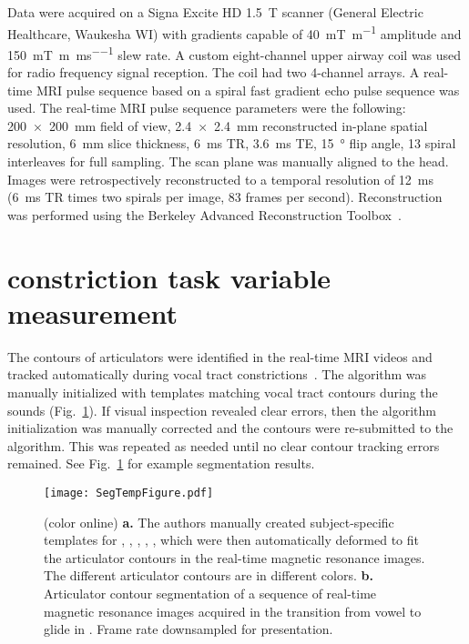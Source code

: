 \documentclass[reprint]{JASAnew}\usepackage[]{graphicx}\usepackage[]{color}
\begin{document}
Data were acquired on a Signa Excite HD \SI{1.5}{\tesla} scanner (General Electric Healthcare, Waukesha WI) with gradients capable of \SI[per-mode=symbol]{40}{\milli\tesla\per\meter} amplitude and \SI[per-mode=repeated-symbol]{150}{\milli\tesla\per\meter\per\milli\second} slew rate. A custom eight-channel upper airway coil was used for radio frequency signal reception. The coil had two 4-channel arrays. 
%
A real-time MRI pulse sequence based on a spiral fast gradient echo pulse sequence was used. 
%
The real-time MRI pulse sequence parameters were the following: 
%
\SI{200 x 200}{\milli\meter} field of view, 
\SI{2.4 x 2.4}{\milli\meter} reconstructed in-plane spatial resolution, 
\SI{6}{\milli\meter} slice thickness,
\SI{6}{\milli\second} TR,
\SI{3.6}{\milli\second} TE,
\SI{15}{\degree} flip angle,
\num{13} spiral interleaves for full sampling.
%
The scan plane was manually aligned to the head. 
%
Images were retrospectively reconstructed to a temporal resolution of \SI{12}{\milli\second} (\SI{6}{\milli\second} TR times two spirals per image, 83 frames per second). 
%
Reconstruction was performed using the Berkeley Advanced Reconstruction Toolbox~\citep{uecker2015berkeley}.







\section{constriction task variable measurement}
\label{sec:cd}

The contours of articulators were identified in the real-time MRI videos and tracked automatically during vocal tract constrictions~\citep{bresch2009region}. The algorithm was manually initialized with templates matching vocal tract contours during the sounds \textipa{[a], [j], [p], [t], [k]} (Fig.~\ref{fig:segtemp}). 
%
If visual inspection revealed clear errors, then the algorithm initialization was manually corrected and the contours were re-submitted to the algorithm. This was repeated as needed until no clear contour tracking errors remained. 
%
See Fig.~\ref{fig:segtemp} for example segmentation results.

\begin{figure}

\texttt{[image: SegTempFigure.pdf]}

\caption{(color online) {\bf a.} The authors manually created subject-specific templates for \textipa{[a]}, \textipa{[i]}, \textipa{[p]}, \textipa{[t]}, \textipa{[k]}, which were then automatically deformed to fit the articulator contours in the real-time magnetic resonance images. The different articulator contours are in different colors.
{\bf b.} Articulator contour segmentation of a sequence of real-time magnetic resonance images acquired in the transition from vowel \textipa{[a]} to glide \textipa{[j]} in \textipa{[aja]}. Frame rate downsampled for presentation.}
\label{fig:segtemp}
\end{figure}
\end{document}
